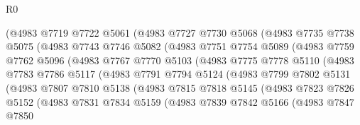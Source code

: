 \begin{lexlean}{R0}
\begin{coremodule}
                (@4983
                  @7719
                  @7722
                  @5061
                  (@4983
                    @7727
                    @7730
                    @5068
                    (@4983
                      @7735
                      @7738
                      @5075
                      (@4983
                        @7743
                        @7746
                        @5082
                        (@4983
                          @7751
                          @7754
                          @5089
                          (@4983
                            @7759
                            @7762
                            @5096
                            (@4983
                              @7767
                              @7770
                              @5103
                              (@4983
                                @7775
                                @7778
                                @5110
                                (@4983
                                  @7783
                                  @7786
                                  @5117
                                  (@4983
                                    @7791
                                    @7794
                                    @5124
                                    (@4983
                                      @7799
                                      @7802
                                      @5131
                                      (@4983
                                        @7807
                                        @7810
                                        @5138
                                        (@4983
                                          @7815
                                          @7818
                                          @5145
                                          (@4983
                                            @7823
                                            @7826
                                            @5152
                                            (@4983
                                              @7831
                                              @7834
                                              @5159
                                              (@4983
                                                @7839
                                                @7842
                                                @5166
                                                (@4983
                                                  @7847
                                                  @7850

\end{coremodule}
\end{lexlean}

